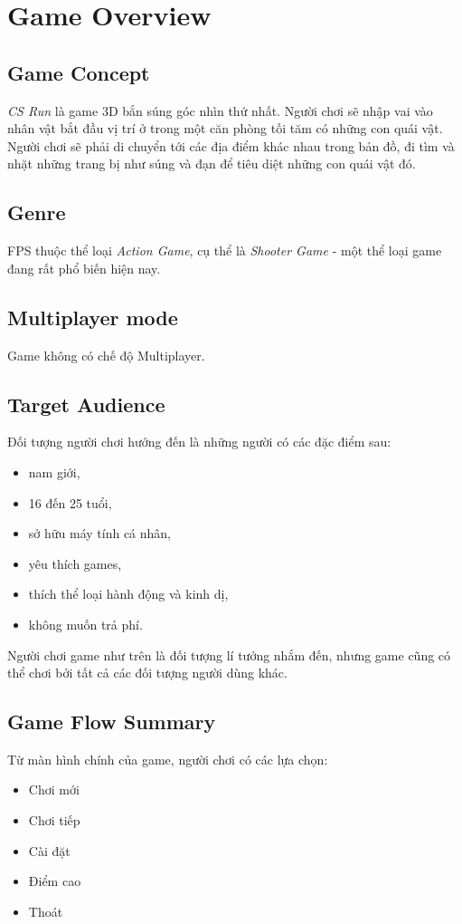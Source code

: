 \documentclass[14pt,a4paper]{extreport}
\begin{document}
\tableofcontents 
\newpage
	
\chapter{Game Overview}
\section{Game Concept}
\textit{CS Run} là game 3D bắn súng góc nhìn thứ nhất. Người chơi sẽ nhập vai vào nhân vật bắt đầu vị trí ở trong một căn phòng tối tăm có những con quái vật. Người chơi sẽ phải di chuyển tới các địa điểm khác nhau trong bản đồ, đi tìm và nhặt những trang bị như súng và đạn để tiêu diệt những con quái vật đó. 


\section{Genre}
FPS thuộc thể loại \textit{Action Game}, cụ thể là \textit{Shooter Game} - một thể loại game đang rất phổ biến hiện nay.

\section{Multiplayer mode}
Game không có chế độ Multiplayer.

\section{Target Audience}
Đối tượng người chơi hướng đến là những người có các đặc điểm sau:
\begin{itemize}
	\item nam giới,
	\item 16 đến 25 tuổi,
	\item sở hữu máy tính cá nhân,
	\item yêu thích games,
	\item thích thể loại hành động và kinh dị,
	\item không muốn trả phí.
\end{itemize}

Người chơi game như trên là đối tượng lí tưởng nhắm đến, nhưng game cũng có thể chơi bởi tất cả các đối tượng người dùng khác.


\section{Game Flow Summary}
Từ màn hình chính của game, người chơi có các lựa chọn:
\begin{itemize}
	\item Chơi mới
	\item Chơi tiếp
	\item Cài đặt
	\item Điểm cao
	\item Thoát
\end{itemize}
\end{document}
